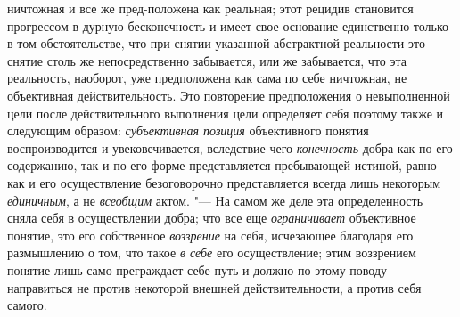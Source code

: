 ничтожная и все же пред-положена как реальная; этот рецидив становится
прогрессом в дурную бесконечность и имеет свое основание единственно только
в том обстоятельстве, что при снятии указанной абстрактной реальности это
снятие столь же непосредственно забывается, или же забывается, что эта
реальность, наоборот, уже предположена как сама по себе ничтожная, не
объективная действительность. Это повторение предположения о невыполненной
цели после действительного выполнения цели определяет себя поэтому также и
следующим образом: {\em субъективная
позиция} объективного понятия воспроизводится и
увековечивается, вследствие чего
{\em конечность} добра
как по его содержанию, так и по его форме представляется
пребывающей истиной, равно как и его осуществление безоговорочно
представляется всегда лишь некоторым
{\em единичным}, а не
{\em всеобщим} актом. "---
На самом же деле эта определенность сняла себя в
осуществлении добра; что все еще
{\em ограничивает}
объективное понятие, это его собственное
{\em воззрение} на себя,
исчезающее благодаря его размышлению о том, что такое
{\em в себе} его
осуществление; этим воззрением понятие лишь само преграждает себе путь и
должно по этому поводу направиться не против некоторой внешней
действительности, а против себя самого.

